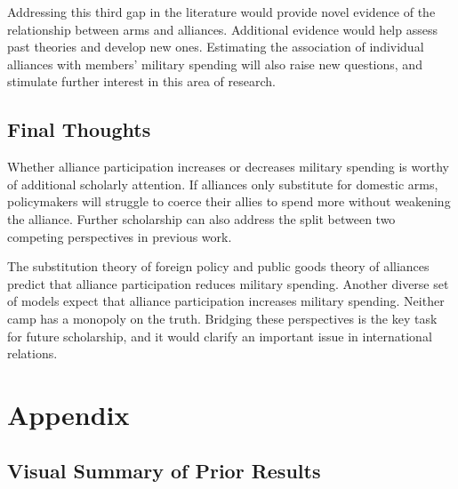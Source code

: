\documentclass[12pt]{article}
\begin{document}
Addressing this third gap in the literature would provide novel evidence of the relationship between arms and alliances. 
Additional evidence would help assess past theories and develop new ones.
Estimating the association of individual alliances with members' military spending will also raise new questions, and stimulate further interest in this area of research. 



\subsection{Final Thoughts} 

Whether alliance participation increases or decreases military spending is worthy of additional scholarly attention. 
If alliances only substitute for domestic arms, policymakers will struggle to coerce their allies to spend more without weakening the alliance. 
Further scholarship can also address the split between two competing perspectives in previous work.


The substitution theory of foreign policy and public goods theory of alliances predict that alliance participation reduces military spending. 
Another diverse set of models expect that alliance participation increases military spending. 
Neither camp has a monopoly on the truth. 
Bridging these perspectives is the key task for future scholarship, and it would clarify an important issue in international relations. 









\section*{Appendix}

\subsection*{Visual Summary of Prior Results} 
\end{document}
